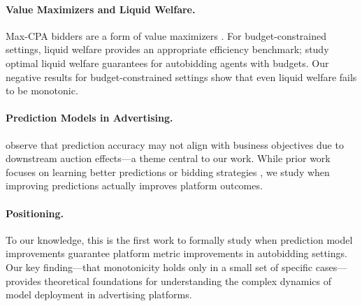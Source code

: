 \paragraph{Value Maximizers and Liquid Welfare.} Max-CPA bidders are a form of value maximizers \citep{wilkens2016value}. For budget-constrained settings, liquid welfare \citep{dobzinski2014liquidwelfare} provides an appropriate efficiency benchmark; \citet{colini2026liquid} study optimal liquid welfare guarantees for autobidding agents with budgets. Our negative results for budget-constrained settings show that even liquid welfare fails to be monotonic.

\paragraph{Prediction Models in Advertising.} \citet{vasile2017cost} observe that prediction accuracy may not align with business objectives due to downstream auction effects---a theme central to our work. While prior work focuses on learning better predictions or bidding strategies \citep{ma2018entire,cai2017real}, we study when improving predictions actually improves platform outcomes.

\paragraph{Positioning.} To our knowledge, this is the first work to formally study when prediction model improvements guarantee platform metric improvements in autobidding settings. Our key finding---that monotonicity holds only in a small set of specific cases---provides theoretical foundations for understanding the complex dynamics of model deployment in advertising platforms.
